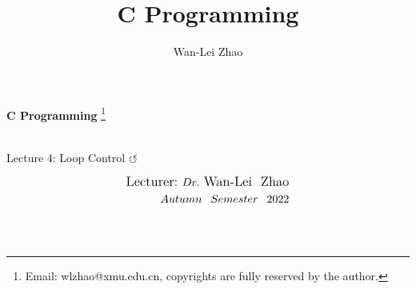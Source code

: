 \documentclass[]{beamer}
\title{C Programming}
\institute{Xiamen University}
\author[Wan-Lei Zhao]{Wan-Lei Zhao}
\newcommand\blfootnote[1]{
  \begingroup
  \renewcommand\thefootnote{}\footnote{#1}
  \addtocounter{footnote}{-1}
  \endgroup
}
\begin{document}
\begin{frame}
   \begin{center}
    \vspace{24pt}
    \Huge\textbf{C Programming}\blfootnote{Email: wlzhao@xmu.edu.cn, copyrights are fully reserved by the author.}\\
     \Huge{Lecture 4: Loop Control $\circlearrowleft$}
    \vspace{36pt}
  \end{center}
  \begin{align*}
   \vspace{18pt}
      \large{\mbox{Lecturer:}~Dr.~\mbox{Wan-Lei~~Zhao}} \\
      \large{Autumn~~Semester~~2022} \\
   \vspace{30pt}
  \end{align*}
\end{frame}




\section{}
\end{document}
